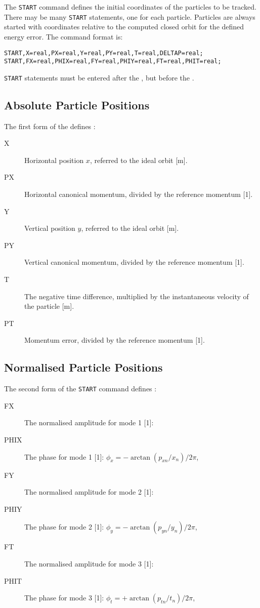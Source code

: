 The \texttt{START} command defines the initial coordinates of
the particles to be tracked.
There may be many \texttt{START} statements, one for each particle.
Particles are always started with coordinates relative
to the computed closed orbit for the defined energy error.
The command format is:
\begin{verbatim}
START,X=real,PX=real,Y=real,PY=real,T=real,DELTAP=real;
START,FX=real,PHIX=real,FY=real,PHIY=real,FT=real,PHIT=real;
\end{verbatim}
\texttt{START} statements must be entered after the
,
but before the .

\subsection{Absolute Particle Positions}
The first form of the  defines 
:
\begin{description}
\item[X]
  Horizontal position $x$, referred to the ideal orbit [m].
\item[PX]
  Horizontal canonical momentum, divided by the reference momentum [1].
\item[Y]
  Vertical position $y$, referred to the ideal orbit [m].
\item[PY]
  Vertical canonical momentum, divided by the reference momentum [1].
\item[T]
  The negative time difference, 
  multiplied by the instantaneous velocity of the particle [m].
\item[PT]
  Momentum error, divided by the reference momentum [1].
\end{description}

\subsection{Normalised Particle Positions}
The second form of the \texttt{START} command defines 
:
\begin{description}
\item[FX]
  The normalised amplitude for mode 1 [1]:
\item[PHIX]
  The phase for mode 1 [1]:
  $\phi_x = - \arctan(p_{xn}/x_n) / 2 \pi$,
\item[FY]
  The normalised amplitude for mode 2 [1]:
\item[PHIY]
  The phase for mode 2 [1]:
  $\phi_y = - \arctan(p_{yn}/y_n) / 2 \pi$,
\item[FT]
  The normalised amplitude for mode 3 [1]:
\item[PHIT]
  The phase for mode 3 [1]:
  $\phi_t = + \arctan(p_{tn}/t_n) / 2 \pi$,
\end{description}

